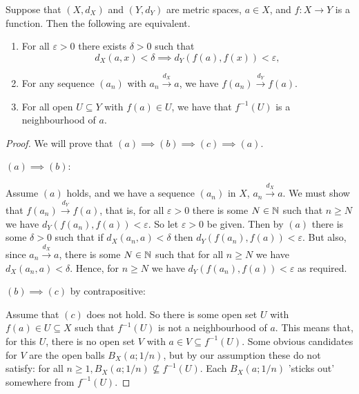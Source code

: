 \documentclass[10pt, a4paper]{article}
\begin{document}
\begin{proposition}
    Suppose that $(X, d_{X})$ and $(Y, d_{Y})$ are metric spaces,
    $a \in X$,
    and $f : X \to Y$ is a function.
    Then the following are equivalent.

    \begin{enumerate}[label = (\alph*)]
        \item For all $\varepsilon > 0$ there exists $\delta > 0$ such that
        \[
        d_{X}(a, x) < \delta \implies d_{Y}(f(a), f(x)) < \varepsilon,
        \]

        \item For any sequence $(a_n)$ with $a_n \xrightarrow{d_{X}} a$,
        we have $f(a_n) \xrightarrow{d_{Y}}f(a)$.

        \item For all open $U \subseteq Y$ with $f(a) \in U$,
        we have that $f ^ {-1}(U)$ is a neighbourhood of $a$.
    \end{enumerate}

    \begin{proof}
        We will prove that $(a) \implies (b) \implies (c) \implies (a)$.

        $(a) \implies (b)$:

        Assume $(a)$ holds,
        and we have a sequence $(a_n)$ in $X$,
        $a_n \xrightarrow{d_{X}} a$.
        We must show that $f(a_n) \xrightarrow{d_{Y}} f(a)$,
        that is,
        for all $\varepsilon > 0$ there is some $N \in \mathbb{N}$ such that $n \geq N$ we have $d_{Y}(f(a_n), f(a)) < \varepsilon$.
        So let $\varepsilon > 0$ be given.
        Then by $(a)$ there is some $\delta > 0$ such that if $d_{X}(a_n, a) < \delta$ then $d_{Y}(f(a_n), f(a)) < \varepsilon$.
        But also,
        since $a_n \xrightarrow{d_{X}} a$,
        there is some $N \in \mathbb{N}$ such that for all $n \geq N$ we have $d_{X}(a_n, a) < \delta$.
        Hence,
        for $n \geq N$ we have $d_{Y}(f(a_n), f(a)) < \varepsilon$ as required.

        $(b) \implies (c)$ by contrapositive:

        Assume that $(c)$ does not hold.
        So there is some open set $U$ with $f(a) \in U \subseteq X$ such that $f ^ {-1}(U)$ is not a neighbourhood of $a$.
        This means that,
        for this $U$,
        there is no open set $V$ with $a \in V \subseteq f ^ {-1}(U)$.
        Some obvious candidates for $V$ are the open balls $B_{X}(a; 1/ n)$,
        but by our assumption these do not satisfy:
        for all $n \geq 1, B_{X}(a; 1 / n) \nsubseteq f ^ {-1}(U)$.
        Each $B_{X}(a; 1 / n)$
        'sticks out'
        somewhere from $f ^ {-1}(U)$.


\end{proof}
\end{proposition}
\end{document}
